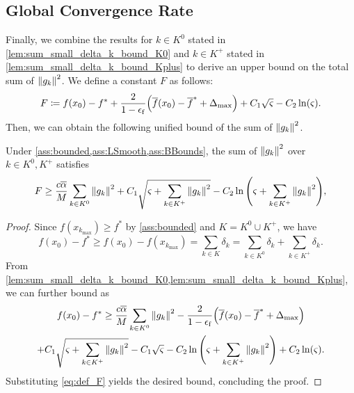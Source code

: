 \documentclass[journal]{subfiles}
\begin{document}
\subsection{Global Convergence Rate}

Finally, we combine the results for $k \in K^0$ stated in \cref{lem:sum_small_delta_k_bound_K0} and $k \in K^+$ stated in \cref{lem:sum_small_delta_k_bound_Kplus} to derive an upper bound on the total sum of $\norm{g_k}^2$.
We define a constant $F$ as follows:
\begin{equation}
    F \coloneqq f(x_0) - f^* + \frac{2}{1-\epsilon_\mathrm{f}} \qty(\overline{f}(x_0) - \overline{f}^* + \Delta_{\max}) + C_1 \sqrt{\varsigma} - C_2 \ln(\varsigma).
    \label{eq:def_F}
\end{equation}
Then, we can obtain the following unified bound of the sum of $\norm{g_k}^2$.
\begin{lemma}\label{lem:sum_norm_g_k_bound}
    Under \cref{ass:bounded,ass:LSmooth,ass:BBounds}, the sum of $\norm{g_{k}}^2$ over $k \in K^0, K^+$ satisfies
    \begin{equation*}
        F \ge
        \frac{c \overline{\alpha}}{M} \sum_{k \in K^0} \norm{g_{k}}^2 +
        C_1 \sqrt{\varsigma + \sum_{k \in K^+} \norm{g_{k}}^2} -
        C_2 \ln\qty(\varsigma+\sum_{k \in K^+} \norm{g_{k}}^2),
    \end{equation*}
\end{lemma}
\begin{proof}
    Since $f(x_{k_{\max}}) \ge f^*$ by \cref{ass:bounded} and $K=K^0 \cup K^+$, we have
    \begin{equation*}
        f(x_0) - f^* \geq f(x_0) - f(x_{k_{\max}}) = \sum_{k \in K} \delta_k = \sum_{k \in K^0} \delta_k + \sum_{k \in K^+} \delta_k.
    \end{equation*}
    From \cref{lem:sum_small_delta_k_bound_K0,lem:sum_small_delta_k_bound_Kplus}, we can further bound as
    \begin{multline*}
        f(x_0) - f^*
        \ge \frac{c \overline{\alpha}}{M} \sum_{k \in K^0} \norm{g_{k}}^2
        - \frac{2}{1-\epsilon_\mathrm{f}} \qty(\overline{f}(x_0) - \overline{f}^* + \Delta_{\max})\\
        +C_1 \sqrt{\varsigma + \sum_{k \in K^+} \norm{g_{k}}^2}
        - C_1 \sqrt{\varsigma}
        - C_2 \ln\qty(\varsigma+\sum_{k \in K^+} \norm{g_{k}}^2)
        + C_2 \ln(\varsigma).
    \end{multline*}
    Substituting \cref{eq:def_F} yields the desired bound, concluding the proof.
    \myQED
\end{proof}
\end{document}
